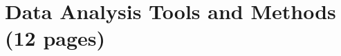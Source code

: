 
\chapter{Data Analysis Tools and Methods (12 pages)}
\label{sec:dataanalysis}





















